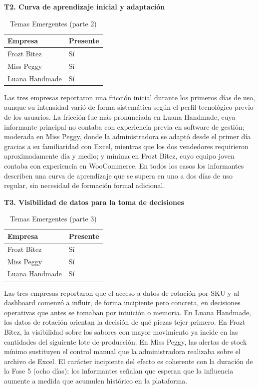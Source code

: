 \textbf{T2. Curva de aprendizaje inicial y adaptación}

\begin{longtable}[]{@{}ll@{}}
\caption[Temas Emergentes (parte 2)]{Temas Emergentes (parte 2)}\tabularnewline
\toprule\noalign{}
Empresa & Presente \\
\midrule\noalign{}
\endhead
\bottomrule\noalign{}
\endlastfoot
Frozt Bitez & Sí \\
Miss Peggy & Sí \\
Luana Handmade & Sí \\
\end{longtable}

Las tres empresas reportaron una fricción inicial durante los primeros días de uso, aunque su intensidad varió de forma sistemática según el perfil tecnológico previo de los usuarios. La fricción fue más pronunciada en Luana Handmade, cuya informante principal no contaba con experiencia previa en software de gestión; moderada en Miss Peggy, donde la administradora se adaptó desde el primer día gracias a su familiaridad con Excel, mientras que los dos vendedores requirieron aproximadamente día y medio; y mínima en Frozt Bitez, cuyo equipo joven contaba con experiencia en WooCommerce. En todos los casos los informantes describen una curva de aprendizaje que se supera en uno a dos días de uso regular, sin necesidad de formación formal adicional.

\textbf{T3. Visibilidad de datos para la toma de decisiones}

\begin{longtable}[]{@{}ll@{}}
\caption[Temas Emergentes (parte 3)]{Temas Emergentes (parte 3)}\tabularnewline
\toprule\noalign{}
Empresa & Presente \\
\midrule\noalign{}
\endhead
\bottomrule\noalign{}
\endlastfoot
Frozt Bitez & Sí \\
Miss Peggy & Sí \\
Luana Handmade & Sí \\
\end{longtable}

Las tres empresas reportaron que el acceso a datos de rotación por SKU y al dashboard comenzó a influir, de forma incipiente pero concreta, en decisiones operativas que antes se tomaban por intuición o memoria. En Luana Handmade, los datos de rotación orientan la decisión de qué piezas tejer primero. En Frozt Bitez, la visibilidad sobre los sabores con mayor movimiento ya incide en las cantidades del siguiente lote de producción. En Miss Peggy, las alertas de stock mínimo sustituyen el control manual que la administradora realizaba sobre el archivo de Excel. El carácter incipiente del efecto es coherente con la duración de la Fase 5 (ocho días); los informantes señalan que esperan que la influencia aumente a medida que acumulen histórico en la plataforma.

